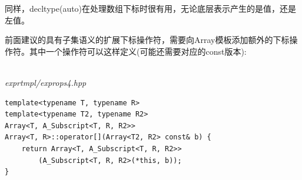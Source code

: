 同样，decltype(auto)在处理数组下标时很有用，无论底层表示产生的是值，还是左值。

前面建议的具有子集语义的扩展下标操作符，需要向Array模板添加额外的下标操作符。其中一个操作符可以这样定义(可能还需要对应的const版本):

\hspace*{\fill} \\ %
\noindent
\textit{exprtmpl/exprops4.hpp}
\begin{lstlisting}[style=styleCXX]
template<typename T, typename R>
template<typename T2, typename R2>
Array<T, A_Subscript<T, R, R2>>
Array<T, R>::operator[](Array<T2, R2> const& b) {
	return Array<T, A_Subscript<T, R, R2>>
		(A_Subscript<T, R, R2>(*this, b));
}
\end{lstlisting}













